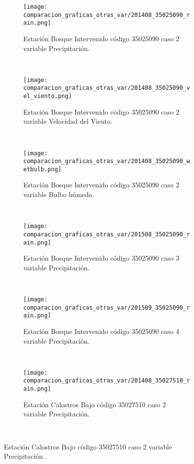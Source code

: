 \begin{figure}[H]
\centering
\begin{subfigure}[normla]{0.4\textwidth}
\caption{Estación Bosque Intervenido   código 35025090 caso 2 variable Precipitación.}
\texttt{[image: comparacion\_graficas\_otras\_var/201408\_35025090\_rain.png]}
\end{subfigure}
~
\begin{subfigure}[normla]{0.4\textwidth}
\caption{Estación Bosque Intervenido   código 35025090 caso 2 variable Velocidad del Viento.}
\texttt{[image: comparacion\_graficas\_otras\_var/201408\_35025090\_vel\_viento.png]}
\end{subfigure}
~
\begin{subfigure}[normla]{0.4\textwidth}
\caption{Estación Bosque Intervenido   código 35025090 caso 2 variable Bulbo húmedo.}
\texttt{[image: comparacion\_graficas\_otras\_var/201408\_35025090\_wetbulb.png]}
\end{subfigure}
~
\begin{subfigure}[normla]{0.4\textwidth}
\caption{Estación Bosque Intervenido   código 35025090 caso 3 variable Precipitación.}
\texttt{[image: comparacion\_graficas\_otras\_var/201508\_35025090\_rain.png]}
\end{subfigure}
~
\begin{subfigure}[normla]{0.4\textwidth}
\caption{Estación Bosque Intervenido   código 35025090 caso 4 variable Precipitación.}
\texttt{[image: comparacion\_graficas\_otras\_var/201509\_35025090\_rain.png]}
\end{subfigure}
~
\begin{subfigure}[normla]{0.4\textwidth}
\caption{Estación Calostros Bajo   código 35027510 caso 2 variable Precipitación.}
\texttt{[image: comparacion\_graficas\_otras\_var/201408\_35027510\_rain.png]}
\end{subfigure}
~
\end{figure}
           
